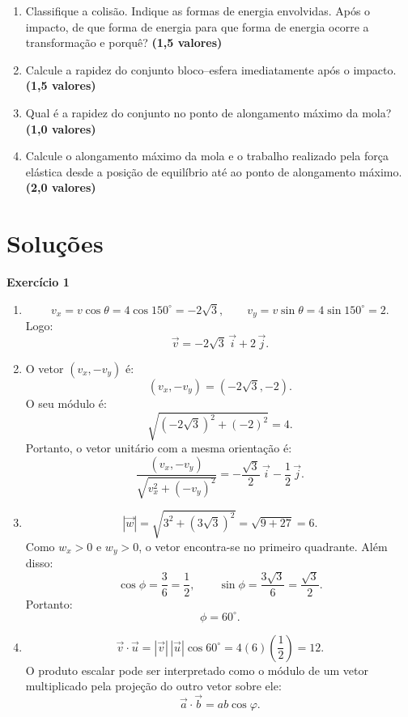 \documentclass[12pt]{article}
\newcommand{\pontos}[1]{\hfill\textbf{(#1 valores)}}
\begin{document}
\begin{enumerate}[label=\textbf{\alph*)}]
	\item Classifique a colisão. Indique as formas de energia envolvidas. Após o impacto,
	de que forma de energia para que forma de energia ocorre a transformação e porquê? \pontos{1,5}
	\item Calcule a rapidez do conjunto bloco--esfera imediatamente após o impacto. \pontos{1,5}
	\item Qual é a rapidez do conjunto no ponto de alongamento máximo da mola? \pontos{1,0}
	\item Calcule o alongamento máximo da mola e o trabalho realizado pela força elástica
	desde a posição de equilíbrio até ao ponto de alongamento máximo. \pontos{2,0}
\end{enumerate}

\newpage

\section*{Soluções}

\textbf{Exercício 1}

\begin{enumerate}[label=\textbf{\alph*)}]
    \item
    \[
    v_x=v\cos\theta=4\cos150^\circ=-2\sqrt{3},
    \qquad
    v_y=v\sin\theta=4\sin150^\circ=2.
    \]
    Logo:
    \[
    \vec{v}=-2\sqrt{3}\,\vec{i}+2\,\vec{j}.
    \]

    \item O vetor $(v_x,-v_y)$ é:
    \[
    (v_x,-v_y)=(-2\sqrt{3},-2).
    \]
    O seu módulo é:
    \[
    \sqrt{(-2\sqrt{3})^2+(-2)^2}=4.
    \]
    Portanto, o vetor unitário com a mesma orientação é:
    \[
    \frac{(v_x,-v_y)}{\sqrt{v_x^2+(-v_y)^2}}
    =-\frac{\sqrt{3}}{2}\,\vec{i}-\frac12\,\vec{j}.
    \]

    \item
    \[
    |\vec{w}|=\sqrt{3^2+(3\sqrt{3})^2}
    =\sqrt{9+27}=6.
    \]
    Como $w_x>0$ e $w_y>0$, o vetor encontra-se no primeiro quadrante. Além disso:
    \[
    \cos\phi=\frac{3}{6}=\frac12,
    \qquad
    \sin\phi=\frac{3\sqrt{3}}{6}=\frac{\sqrt{3}}{2}.
    \]
    Portanto:
    \[
    \phi=60^\circ.
    \]

    \item
    \[
    \vec{v}\cdot\vec{u}
    =|\vec{v}|\,|\vec{u}|\cos60^\circ
    =4(6)\left(\frac12\right)
    =12.
    \]
    O produto escalar pode ser interpretado como o módulo de um vetor multiplicado
    pela projeção do outro vetor sobre ele:
    \[
    \vec{a}\cdot\vec{b}=ab\cos\varphi.
    \]
\end{enumerate}
\end{document}
